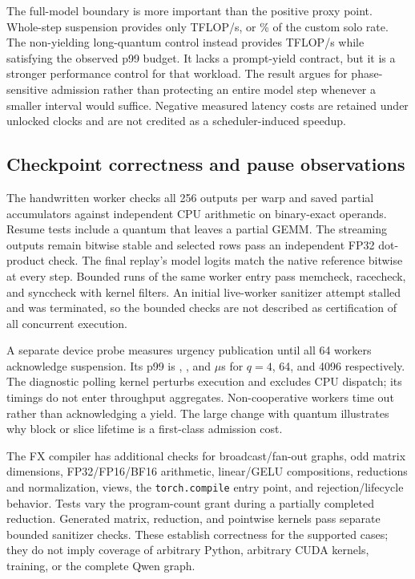 The full-model boundary is more important than the positive proxy point.
Whole-step suspension provides only \slackModelMediumRate{} TFLOP/s,
or \slackModelMediumFraction\% of the custom solo rate. The non-yielding
long-quantum control instead provides \slackModelLongRate{} TFLOP/s
while satisfying the observed p99 budget. It lacks a prompt-yield contract,
but it is a stronger performance control for that workload. The result
argues for phase-sensitive admission rather than protecting an entire model
step whenever a smaller interval would suffice. Negative measured latency
costs are retained under unlocked clocks and are not credited as a
scheduler-induced speedup.

\subsection{Checkpoint correctness and pause observations}
The handwritten worker checks all 256 outputs per warp and saved partial
accumulators against independent CPU arithmetic on binary-exact operands.
Resume tests include a quantum that leaves a partial GEMM. The streaming
outputs remain bitwise stable and selected rows pass an independent FP32
dot-product check. The final replay's model logits match the native reference
bitwise at every step. Bounded runs of the same worker entry pass memcheck,
racecheck, and synccheck with kernel filters. An initial live-worker sanitizer
attempt stalled and was terminated, so the bounded checks are not described
as certification of all concurrent execution.

A separate device probe measures urgency publication until all 64 workers
acknowledge suspension. Its p99 is \slackPauseShort{},
\slackPauseMedium{}, and \slackPauseLong{} $\mu$s for $q=4$, 64,
and 4096 respectively. The diagnostic polling kernel perturbs execution
and excludes CPU dispatch; its timings do not enter throughput aggregates.
Non-cooperative workers time out rather than acknowledging a yield.
The large change with quantum illustrates why block or slice lifetime is a
first-class admission cost.

The FX compiler has additional checks for broadcast/fan-out graphs, odd
matrix dimensions, FP32/FP16/BF16 arithmetic, linear/GELU compositions,
reductions and normalization, views, the \texttt{torch.compile} entry point,
and rejection/lifecycle behavior. Tests vary the program-count grant during
a partially completed reduction. Generated matrix, reduction, and pointwise
kernels pass separate bounded sanitizer checks. These establish correctness
for the supported cases; they do not imply coverage of arbitrary Python,
arbitrary CUDA kernels, training, or the complete Qwen graph.

